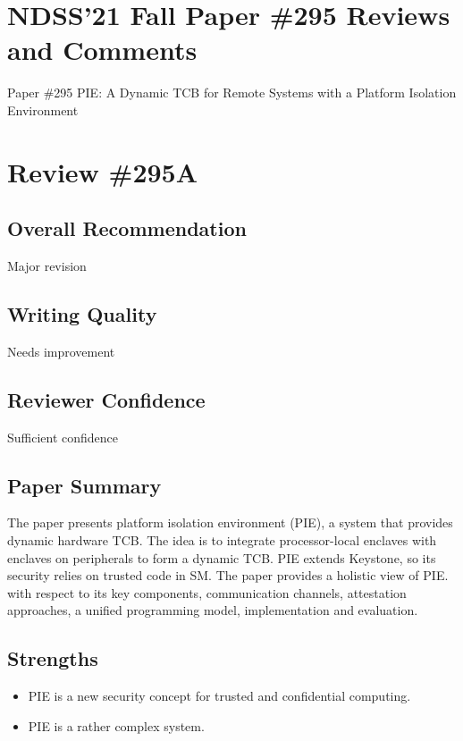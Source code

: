 \documentclass[9pt]{article}
\begin{document}
\section{NDSS'21 Fall Paper \#295 Reviews and Comments}

Paper \#295 PIE: A Dynamic TCB for Remote Systems with a Platform
Isolation Environment

\section{Review \#295A}

\subsection{Overall Recommendation}


  Major revision


\subsection{Writing Quality}


  Needs improvement


\subsection{Reviewer Confidence}


  Sufficient confidence


\subsection{Paper Summary}

The paper presents platform isolation environment (PIE), a system that
provides dynamic hardware TCB. The idea is to integrate processor-local
enclaves with enclaves on peripherals to form a dynamic TCB. PIE extends
Keystone, so its security relies on trusted code in SM. The paper
provides a holistic view of PIE. with respect to its key components,
communication channels, attestation approaches, a unified programming
model, implementation and evaluation.

\subsection{Strengths}

\begin{itemize}
\item
  PIE is a new security concept for trusted and confidential computing.
\item
  PIE is a rather complex system.
\end{itemize}
\end{document}
